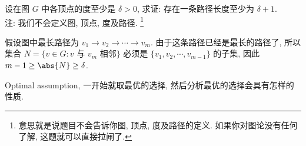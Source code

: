 \begin{prob}
\label{prob:prob-10}
设在图 $G$ 中各顶点的度至少是 $\delta > 0$,
求证: 存在一条路径长度至少为 $\delta + 1$.\\
注: 我们不会定义图, 顶点, 度及路径.
\footnote{意思就是说题目不会告诉你图, 顶点, 度及路径的定义.
如果你对图论没有任何了解, 这题就可以直接拉闸了.}
\end{prob}

\begin{soln}
假设图中最长路径为 $v_1 \to v_2 \to \cdots \to v_m$.
由于这条路径已经是最长的路径了, 所以集合
$N = \{v \in G: \text{$v$ 与 $v_m$ 相邻}\}$ 必须是
$\{v_1, v_2, \cdots, v_{m-1}\}$ 的子集,
因此 $m - 1 \ge \abs{N} \ge \delta$.
\end{soln}

\begin{rem*}
Optimal assumption, 一开始就取最优的选择,
然后分析最优的选择会具有怎样的性质.
\end{rem*}
